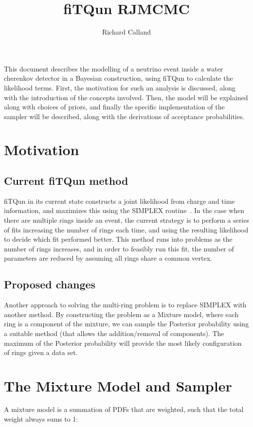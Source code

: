 \documentclass[11pt]{article} %
\title{fiTQun RJMCMC}
\author{Richard Calland}
\begin{document}
\maketitle
This document describes the modelling of a  neutrino event inside a water cherenkov detector in a Bayesian construction, using fiTQun to calculate the likelihood terms. First, the motivation for such an analysis is discussed, along with the introduction of the concepts involved. Then, the model will be explained along with choices of priors, and finally the specific implementation of the sampler will  be described, along with the derivations of acceptance probabilities.

\section{Motivation}
\subsection{Current fiTQun method}
fiTQun in its current state constructs a joint likelihood from charge and time information, and maximizes this using the SIMPLEX routine~\cite{SIMPLEX}. In the case when there are multiple rings inside an event, the current strategy is to perform a series of fits increasing the number of rings each time, and using the resulting likelihood to decide which fit performed better. This method runs into problems as the number of rings increases, and in order to feasibly run this fit, the number of parameters are reduced by assuming all rings share a common vertex.

\subsection{Proposed changes}
Another approach to solving the multi-ring problem is to replace SIMPLEX with another method. By constructing the problem as a Mixture model, where each ring is a component of the mixture, we can sample the Posterior probability using a suitable method (that allows the addition/removal of components). The maximum of the Posterior probability will provide the most likely configuration of rings given a data set.

\section{The Mixture Model and Sampler}
A mixture model is a summation of PDFs that are weighted, such that the total weight always sums to 1: 
\end{document}
